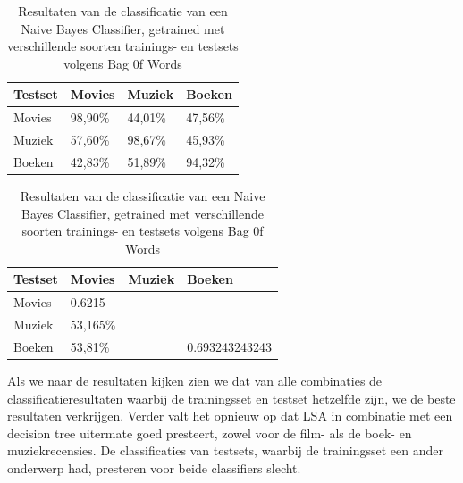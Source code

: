 \begin{table}[h]
\centering
\setlength\tabcolsep{4pt}
\begin{minipage}{0.48\textwidth}
\centering
\begin{tabular}{|l|l|l|l|}
\hline
Testset & Movies  & Muziek  & Boeken  \\  \hline
Movies  & 98,90\% & 44,01\% & 47,56\% \\  \hline
Muziek  & 57,60\% & 98,67\% & 45,93\% \\ \hline
Boeken  & 42,83\% & 51,89\% & 94,32\% \\ \hline
\end{tabular}
\caption{Resultaten van de classificatie met een Decision Tree, getrained op LSA features met verschillende soorten trainings- en testsets}
\label{tab:accuracy}
\end{minipage}%
\hfill
\begin{minipage}{0.48\textwidth}
\centering
\begin{tabular}{|l|l|l|l|}
\hline
Testset & Movies   & Muziek & Boeken         \\ \hline
Movies  & 0.6215   &        &                \\ \hline
Muziek  & 53,165\% &        &                \\ \hline
Boeken  & 53,81\%  &        & 0.693243243243 \\ \hline
\end{tabular}
 \caption{Resultaten van de classificatie van een Naive Bayes Classifier, getrained met verschillende soorten trainings- en testsets volgens Bag 0f Words} 
 \label{tab:ompdiff} 
\end{minipage}
\end{table}

Als we naar de resultaten kijken zien we dat van alle combinaties de classificatieresultaten waarbij de trainingsset en testset hetzelfde zijn, we de beste resultaten verkrijgen.
Verder valt het opnieuw op dat LSA in combinatie met een decision tree uitermate goed presteert, zowel voor de film- als de boek- en muziekrecensies.
De classificaties van testsets, waarbij de trainingsset een ander onderwerp had, presteren voor beide classifiers slecht.


